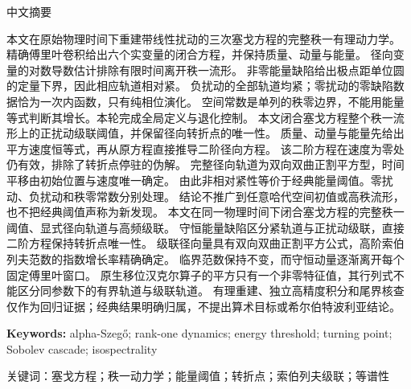 \documentclass[10pt]{article}
\begin{document}
\begin{abstract}
second-order equation gives a two-sided hyperbolic-secant-squared profile,
including its turning point. For every Sobolev exponent above one half,
the logarithmic norm-growth rate is the positive radial exponent multiplied
by the distance of that Sobolev exponent from one half.
The critical norm remains constant while momentum leaves every fixed
Fourier window. The native shifted-Hankel square has only one nonzero
eigenvalue and a degree-one Fredholm determinant.
At fixed positive perturbation a bounded pure mode and a cascading solution
share this determinant, so auxiliary isospectrality does not determine even
the recurrence type. Exact rational reconstruction and independent
high-precision calculations audit the source formulas.
The classical threshold is credited to Xu; no arithmetic target, generic
Hardy-data classification, or Hilbert--P\'olya conclusion is claimed.
\fi
\end{abstract}
\begin{center}{\cjkfont 中文摘要}\end{center}
{\cjkfont\small\raggedright
\ifcase\CRevisionRound
本文在原始物理时间下重建带线性扰动的三次塞戈方程的完整秩一有理动力学。
精确傅里叶卷积给出六个实变量的闭合方程，并保持质量、动量与能量。
径向变量的对数导数估计排除有限时间离开秩一流形。
非零能量缺陷给出极点距单位圆的定量下界，因此相应轨道相对紧。
负扰动的全部轨道均紧；零扰动的零缺陷数据恰为一次内函数，只有纯相位演化。
空间常数是单列的秩零边界，不能用能量等式判断其增长。本轮完成全局定义与退化控制。
\or
本文闭合塞戈方程整个秩一流形上的正扰动级联阈值，并保留径向转折点的唯一性。
质量、动量与能量先给出平方速度恒等式，再从原方程直接推导二阶径向方程。
该二阶方程在速度为零处仍有效，排除了转折点停驻的伪解。
完整径向轨道为双向双曲正割平方型，时间平移由初始位置与速度唯一确定。
由此非相对紧性等价于经典能量阈值。零扰动、负扰动和秩零常数分别处理。
结论不推广到任意哈代空间初值或高秩流形，也不把经典阈值声称为新发现。
\else
本文在同一物理时间下闭合塞戈方程的完整秩一阈值、显式径向轨道与高频级联。
守恒能量缺陷区分紧轨道与正扰动级联，直接二阶方程保持转折点唯一性。
级联径向量具有双向双曲正割平方公式，高阶索伯列夫范数的指数增长率精确确定。
临界范数保持不变，而守恒动量逐渐离开每个固定傅里叶窗口。
原生移位汉克尔算子的平方只有一个非零特征值，其行列式不能区分同参数下的有界轨道与级联轨道。
有理重建、独立高精度积分和尾界核查仅作为回归证据；经典结果明确归属，不提出算术目标或希尔伯特波利亚结论。
\fi\par}
\noindent\textbf{Keywords:} alpha-Szeg\H{o}; rank-one dynamics; energy threshold; turning point; Sobolev cascade; isospectrality\par
{\cjkfont\noindent 关键词：塞戈方程；秩一动力学；能量阈值；转折点；索伯列夫级联；等谱性\par}
\end{document}
